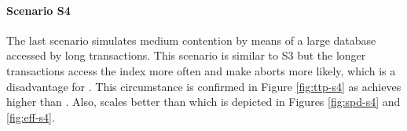 

\paragraph{Scenario S4}

The last scenario simulates medium contention by means of a large database
accessed by long transactions. This scenario is similar to S3 but the longer
transactions access the index more often and make aborts more likely, which is a
disadvantage for \midas. This circumstance is confirmed in Figure
\ref{fig:ttp-s4} as \echo achieves higher \ttp than \midas. Also, \echo scales
better than \midas which is depicted in Figures \ref{fig:spd-s4} and
\ref{fig:eff-s4}.

